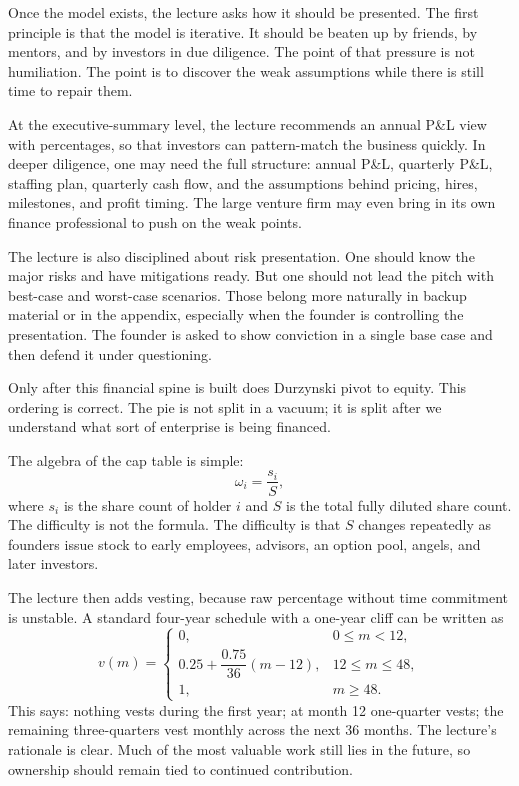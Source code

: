 Once the model exists, the lecture asks how it should be presented. The first principle is that the model is iterative. It should be beaten up by friends, by mentors, and by investors in due diligence. The point of that pressure is not humiliation. The point is to discover the weak assumptions while there is still time to repair them.

At the executive-summary level, the lecture recommends an annual P\&L view with percentages, so that investors can pattern-match the business quickly. In deeper diligence, one may need the full structure: annual P\&L, quarterly P\&L, staffing plan, quarterly cash flow, and the assumptions behind pricing, hires, milestones, and profit timing. The large venture firm may even bring in its own finance professional to push on the weak points.

The lecture is also disciplined about risk presentation. One should know the major risks and have mitigations ready. But one should not lead the pitch with best-case and worst-case scenarios. Those belong more naturally in backup material or in the appendix, especially when the founder is controlling the presentation. The founder is asked to show conviction in a single base case and then defend it under questioning.

Only after this financial spine is built does Durzynski pivot to equity. This ordering is correct. The pie is not split in a vacuum; it is split after we understand what sort of enterprise is being financed.

The algebra of the cap table is simple:
\begin{equation}
\omega_i = \frac{s_i}{S},
\end{equation}
where \(s_i\) is the share count of holder \(i\) and \(S\) is the total fully diluted share count. The difficulty is not the formula. The difficulty is that \(S\) changes repeatedly as founders issue stock to early employees, advisors, an option pool, angels, and later investors.

The lecture then adds vesting, because raw percentage without time commitment is unstable. A standard four-year schedule with a one-year cliff can be written as
\begin{equation}
v(m)=
\begin{cases}
0, & 0 \le m < 12, \\
0.25 + \dfrac{0.75}{36}(m-12), & 12 \le m \le 48, \\
1, & m \ge 48.
\end{cases}
\end{equation}
This says: nothing vests during the first year; at month 12 one-quarter vests; the remaining three-quarters vest monthly across the next 36 months. The lecture's rationale is clear. Much of the most valuable work still lies in the future, so ownership should remain tied to continued contribution.

